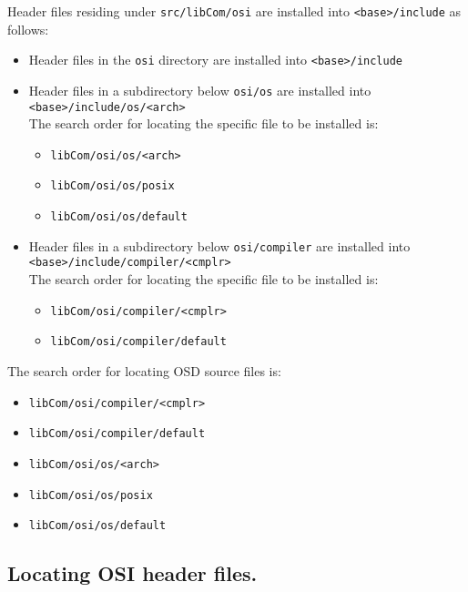 Header files residing under \verb|src/libCom/osi| are installed into \verb|<base>/include| as follows:

\begin{itemize}
\item Header files in the \verb|osi| directory are installed into \verb|<base>/include|

\item Header files in a subdirectory below \verb|osi/os| are installed into \verb|<base>/include/os/<arch>|\\
The search order for locating the specific file to be installed is:

\begin{itemize}
\item \verb|libCom/osi/os/<arch>|
\item \verb|libCom/osi/os/posix|
\item \verb|libCom/osi/os/default|
\end{itemize}

\item Header files in a subdirectory below \verb|osi/compiler| are installed into \verb|<base>/include/compiler/<cmplr>|\\
The search order for locating the specific file to be installed is:

\begin{itemize}
\item \verb|libCom/osi/compiler/<cmplr>|
\item \verb|libCom/osi/compiler/default|
\end{itemize}

\end{itemize}

The search order for locating OSD source files is:

\begin{itemize}
\item \verb|libCom/osi/compiler/<cmplr>|
\item \verb|libCom/osi/compiler/default|
\item \verb|libCom/osi/os/<arch>|
\item \verb|libCom/osi/os/posix|
\item \verb|libCom/osi/os/default|

\end{itemize}

\subsection{Locating OSI header files.}

